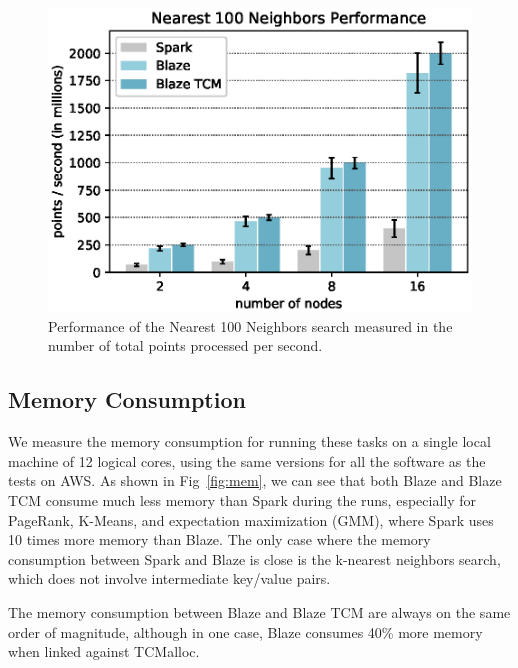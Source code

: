 \begin{figure}
  \begin{center}
  \includegraphics[width=0.7\linewidth]{figs/nn_speed.eps}
  \end{center}
  \vspace{-0.2cm}
  \caption{Performance of the Nearest 100 Neighbors search measured in the number of total points processed per second.
  }
  \label{fig:nn}
\end{figure}
\subsection{Memory Consumption}

We measure the memory consumption for running these tasks on a single local machine of 12 logical cores, using the same versions for all the software as the tests on AWS.
As shown in Fig~\ref{fig:mem}, we can see that both Blaze and Blaze TCM consume much less memory than Spark during the runs, especially for PageRank, K-Means, and expectation maximization (GMM), where Spark uses 10 times more memory than Blaze.
The only case where the memory consumption between Spark and Blaze is close is the k-nearest neighbors search, which does not involve intermediate key/value pairs.

The memory consumption between Blaze and Blaze TCM are always on the same order of magnitude, although in one case, Blaze consumes 40\% more memory when linked against TCMalloc.

